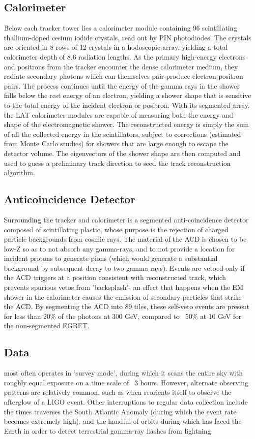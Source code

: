 \subsection{Calorimeter}
Below each tracker tower lies a calorimeter module containing 96 scintillating thallium-doped cesium iodide crystals, read out by PIN photodiodes. The crystals are oriented in 8 rows of 12 crystals in a hodoscopic array, yielding a total calorimeter depth of 8.6 radiation lengths. As the primary high-energy electrons and positrons from the tracker encounter the dense calorimeter medium, they radiate secondary photons which can themselves pair-produce electron-positron pairs. The process continues until the energy of the gamma rays in the shower falls below the rest energy of an electron, yielding a shower shape that is sensitive to the total energy of the incident electron or positron. 
With its segmented array, the LAT calorimeter modules are capable of measuring both the energy and shape of the electromagnetic shower. The reconstructed energy is simply the sum of all the collected energy in the scintillators, subject to corrections (estimated from Monte Carlo studies) for showers that are large enough to escape the detector volume. The eigenvectors of the shower shape are then computed and used to guess a preliminary track direction to seed the track reconstruction algorithm.

\subsection{Anticoincidence Detector}
Surrounding the tracker and calorimeter is a segmented anti-coincidence detector composed of scintillating plastic, whose purpose is the rejection of charged particle backgrounds from cosmic rays. The material of the ACD is chosen to be low-Z so as to not absorb any gamma-rays, and to not provide a location for incident protons to generate pions (which would generate a substantial background by subsequent decay to two gamma rays). 
Events are vetoed only if the ACD triggers at a position consistent with reconstructed track, which prevents spurious vetos from 'backsplash'- an effect that happens when the EM shower in the calorimeter causes the emission of secondary particles that strike the ACD. By segmenting the ACD into 89 tiles, these self-veto events are present for less than 20\% of the photons at 300 GeV, compared to ~50\% at 10 GeV for the non-segmented EGRET.

\subsection{Data}
\Fermi most often operates in 'survey mode', during which it scans the entire sky with roughly equal exposure on a time scale of ~3 hours. However, alternate observing patterns are relatively common, such as when \Fermi reorients itself to observe the afterglow of a LIGO event. Other interruptions to regular data collection include the times \Fermi traverses the South Atlantic Anomaly (during which the event rate becomes extremely high), and the handful of orbits during which \Fermi has faced the Earth in order to detect terrestrial gamma-ray flashes from lightning.

